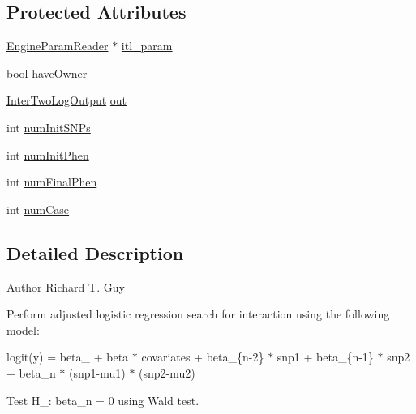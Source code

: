 \subsection*{Protected Attributes}
\begin{DoxyCompactItemize}
\item 
\hyperlink{classEngineParamReader}{EngineParamReader} $\ast$ \hyperlink{classInterTwoLog_a1a1c375b7f30632abd59d0f2f61fc626}{itl\_\-param}
\item 
bool \hyperlink{classInterTwoLog_a5e71ddd55de30562ad4f92519bee43de}{haveOwner}
\item 
\hyperlink{classInterTwoLogOutput}{InterTwoLogOutput} \hyperlink{classInterTwoLog_a25742365edccdd4b3be23f85a39d942a}{out}
\item 
int \hyperlink{classInterTwoLog_abc10f45a18be673c9da60e34e34407a1}{numInitSNPs}
\item 
int \hyperlink{classInterTwoLog_aa36dd9a588d9b0ad8a322ac3672f22f0}{numInitPhen}
\item 
int \hyperlink{classInterTwoLog_a039b29fdef4854a0c85ae37bd2547a26}{numFinalPhen}
\item 
int \hyperlink{classInterTwoLog_ab677684383a49037019f4288a08983f3}{numCase}
\end{DoxyCompactItemize}


\subsection{Detailed Description}
\begin{DoxyAuthor}{Author}
Richard T. Guy
\end{DoxyAuthor}
Perform adjusted logistic regression search for interaction using the following model:

logit(y) = beta\_ + beta $\ast$ covariates + beta\_\-\{n-\/2\} $\ast$ snp1 + beta\_\-\{n-\/1\} $\ast$ snp2 + beta\_\-n $\ast$ (snp1-\/mu1) $\ast$ (snp2-\/mu2)

Test H\_: beta\_\-n = 0 using Wald test. 

